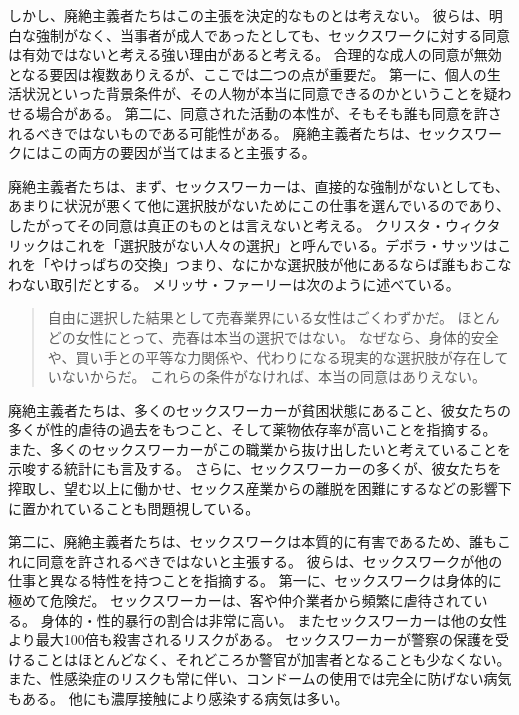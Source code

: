 \documentclass[paper=a4,book,openany]{jlreq} \usepackage{mystyle}
\begin{document}
しかし、廃絶主義者たちはこの主張を決定的なものとは考えない。
彼らは、明白な強制がなく、当事者が成人であったとしても、セックスワークに対する同意は有効ではないと考える強い理由があると考える。
合理的な成人の同意が無効となる要因は複数ありえるが、ここでは二つの点が重要だ。
第一に、個人の生活状況といった背景条件が、その人物が本当に同意できるのかということを疑わせる場合がある。
第二に、同意された活動の本性が、そもそも誰も同意を許されるべきではないものである可能性がある。
廃絶主義者たちは、セックスワークにはこの両方の要因が当てはまると主張する。

廃絶主義者たちは、まず、セックスワーカーは、直接的な強制がないとしても、あまりに状況が悪くて他に選択肢がないためにこの仕事を選んでいるのであり、したがってその同意は真正のものとは言えないと考える。
クリスタ・ウィクタリックはこれを「選択肢がない人々の選択」と呼んでいる\citep[p.63]{wichterich00:_global_woman}。デボラ・サッツはこれを「やけっぱちの交換」{\DDASH}つまり、なにかな選択肢が他にあるならば誰もおこなわない取引{\DDASH}だとする\citep[p.71]{satz95:_market_women_sexual_labor}。
メリッサ・ファーリーは次のように述べている。

\begin{quote}
自由に選択した結果として売春業界にいる女性はごくわずかだ。
ほとんどの女性にとって、売春は本当の選択ではない。
なぜなら、身体的安全や、買い手との平等な力関係や、代わりになる現実的な選択肢が存在していないからだ。
これらの条件がなければ、本当の同意はありえない。
\citep{farley13:_prost_liber_slaver}
\end{quote}

廃絶主義者たちは、多くのセックスワーカーが貧困状態にあること、彼女たちの多くが性的虐待の過去をもつこと、そして薬物依存率が高いことを指摘する。
また、多くのセックスワーカーがこの職業から抜け出したいと考えていることを示唆する統計にも言及する。
さらに、セックスワーカーの多くが、彼女たちを搾取し、望む以上に働かせ、セックス産業からの離脱を困難にするなどの影響下に置かれていることも問題視している。

第二に、廃絶主義者たちは、セックスワークは本質的に有害であるため、誰もこれに同意を許されるべきではないと主張する。
彼らは、セックスワークが他の仕事と異なる特性を持つことを指摘する。
第一に、セックスワークは身体的に極めて危険だ。
セックスワーカーは、客や仲介業者から頻繁に虐待されている。
身体的・性的暴行の割合は非常に高い。
またセックスワーカーは他の女性より最大100倍も殺害されるリスクがある\citep{salfati08:_prost_homic}。
セックスワーカーが警察の保護を受けることはほとんどなく、それどころか警官が加害者となることも少なくない。
また、性感染症のリスクも常に伴い、コンドームの使用では完全に防げない病気もある。
他にも濃厚接触により感染する病気は多い。
\end{document}
